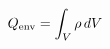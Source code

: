 \documentclass[preview]{standalone}
\begin{document}
\begin{align*}
\special{dvisvgm:raw <g id='unique000'>}Q_{\rm env}=\int_V\rho\,dV\special{dvisvgm:raw </g>}
\end{align*}
\end{document}
